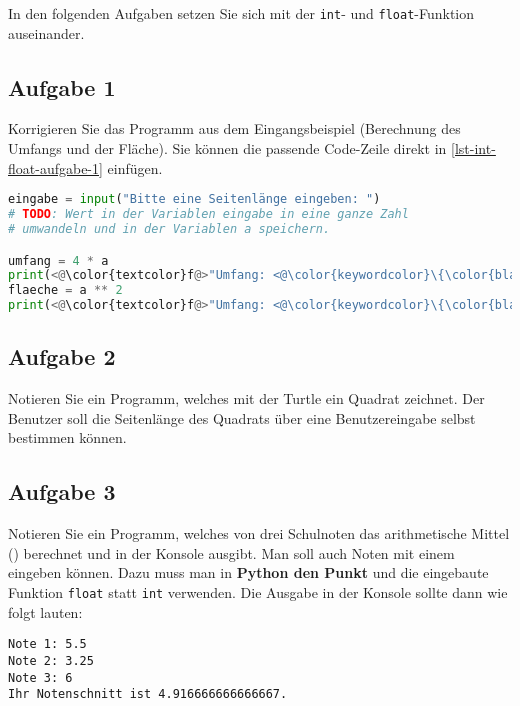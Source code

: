 In den folgenden Aufgaben setzen Sie sich mit der \lstinline{int}- und \lstinline{float}-Funktion auseinander.

\subsection{Aufgabe 1}

Korrigieren Sie das Programm aus dem Eingangsbeispiel (Berechnung des Umfangs und der Fläche). Sie können die passende Code-Zeile direkt in \autoref{lst-int-float-aufgabe-1} einfügen.

\begin{lstlisting}[language=python, caption={\graybgtexttt{quadrat\_berechnungen\_input.py}}, label=lst-int-float-aufgabe-1]
eingabe = input("Bitte eine Seitenlänge eingeben: ")
# TODO: Wert in der Variablen eingabe in eine ganze Zahl
# umwandeln und in der Variablen a speichern.

umfang = 4 * a
print(<@\color{textcolor}f@>"Umfang: <@\color{keywordcolor}\{\color{black}umfang\color{keywordcolor}\}@>")
flaeche = a ** 2
print(<@\color{textcolor}f@>"Umfang: <@\color{keywordcolor}\{\color{black}flaeche\color{keywordcolor}\}@>")
\end{lstlisting}

\subsection{Aufgabe 2}

Notieren Sie ein Programm, welches mit der Turtle ein Quadrat zeichnet. Der Benutzer soll die Seitenlänge des Quadrats über eine Benutzereingabe selbst bestimmen können.


\newpage

\subsection{Aufgabe 3}

Notieren Sie ein Programm, welches von drei Schulnoten das arithmetische Mittel () berechnet und in der Konsole ausgibt. Man soll auch Noten mit einem  eingeben können. Dazu muss man in \textbf{Python den Punkt} und die eingebaute Funktion \lstinline{float} statt \lstinline{int} verwenden. Die Ausgabe in der Konsole sollte dann wie folgt lauten:

\begin{lstlisting}[language=output]
Note 1: 5.5
Note 2: 3.25
Note 3: 6
Ihr Notenschnitt ist 4.916666666666667.
\end{lstlisting}

